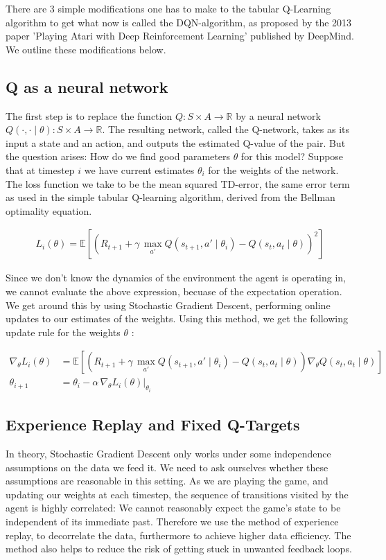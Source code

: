 \documentclass[12pt,letterpaper]{article}
\begin{document}
There are 3 simple modifications one has to make to the tabular Q-Learning algorithm to get what 
now is called the DQN-algorithm, as proposed by the 2013 paper 'Playing Atari with Deep Reinforcement 
Learning' published by DeepMind. We outline these modifications below. 

\subsection{Q as a neural network}
The first step is to replace the function $Q:S\times A \rightarrow \mathbb{R}$ by a neural network \linebreak
${Q(\cdot, \cdot \mid \theta):S \times A \rightarrow \mathbb{R}}$. The resulting network, called 
the Q-network, takes as its input a state and an action, and outputs the estimated Q-value of the 
pair. But the question arises: How do we find good parameters $\theta$ for this model? Suppose that
 at timestep $i$ we have current estimates $\theta_i$ for the weights of the network. The loss
  function we take to be the mean squared TD-error, the same error term as used in the simple 
  tabular Q-learning algorithm, derived from the Bellman optimality equation. 

\begin{align}
L_i(\theta) = \mathbb{E} \left[ \left( R_{t+1} + \gamma\, \max\limits_{a'} Q(s_{t+1}, a' \mid \theta_i) - Q(s_t, a_t \mid \theta) \right)^2 \right]
\end{align}

Since we don't know the dynamics of the environment the agent is operating in, we cannot evaluate 
the above expression, becuase of the expectation operation. We get around this by using Stochastic
Gradient Descent, performing online updates to our estimates of the weights. Using this method,
we get the following update rule for the weights $\theta$ :

\begin{align}
\nabla_{\theta} L_i (\theta) &= \mathbb{E} \left[ \left( R_{t+1} + \gamma\, \max\limits_{a'} Q(s_{t+1}, a' \mid \theta_i) - Q(s_t, a_t \mid \theta) \right) \nabla_{\theta} Q(s_t, a_t \mid \theta ) \right] \\
\theta_{i+1} &= \theta_i - \alpha\, \nabla_{\theta} L_i (\theta) \rvert _{\theta_i}
\end{align}

\subsection{Experience Replay and Fixed Q-Targets}
In theory, Stochastic Gradient Descent only works under some independence assumptions on the data 
we feed it. We need to ask ourselves whether these assumptions are reasonable in this setting. As 
we are playing the game, and updating our weights at each timestep, the sequence of transitions 
visited by the agent is highly correlated: We cannot reasonably expect the game's state to be independent
of its immediate past. Therefore we use the method of experience replay, to decorrelate the data, 
furthermore to achieve higher data efficiency. The method also helps to reduce the risk of getting stuck 
in unwanted feedback loops. \\
\end{document}
